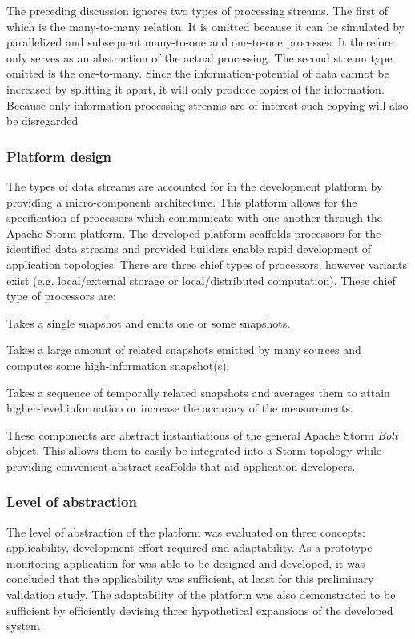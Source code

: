 The preceding discussion ignores two types of processing streams. The first of which is the many-to-many relation. It is omitted because it can be simulated by parallelized and subsequent many-to-one and one-to-one processes. It therefore only serves as an abstraction of the actual processing. The second stream type omitted is the one-to-many. Since the information-potential of data cannot be increased by splitting it apart, it will only produce copies of the information. Because only information processing streams are of interest such copying will also be disregarded

\subsubsection{Platform design}
The types of data streams are accounted for in the development platform by providing a micro-component architecture. This platform allows for the specification of processors which communicate with one another through the Apache Storm platform. The developed platform scaffolds processors for the identified data streams and provided builders enable rapid development of application topologies. There are three chief types of processors, however variants exist (e.g. local/external storage or local/distributed computation). These chief type of processors are:
\begin{description}[style=nextline]
\nospace
\item[SingleMessageProcessor]Takes a single snapshot and emits one or some snapshots.
\item[AccumulatorProcessor]Takes a large amount of related snapshots emitted by many sources and computes some high-information snapshot(s).
\item[BufferedProcessor]Takes a sequence of temporally related snapshots and averages them to attain higher-level information or increase the accuracy of the measurements.
\end{description}
These components are abstract instantiations of the general Apache Storm \emph{Bolt} object. This allows them to easily be integrated into a Storm topology while providing convenient abstract scaffolds that aid application developers.

\subsubsection{Level of abstraction}
The level of abstraction of the platform was evaluated on three concepts: applicability, development effort required and adaptability. As a prototype monitoring application for \idsystems was able to be designed and developed, it was concluded that the applicability was sufficient, at least for this preliminary validation study. The adaptability of the platform was also demonstrated to be sufficient by efficiently devising three hypothetical expansions of the developed system

